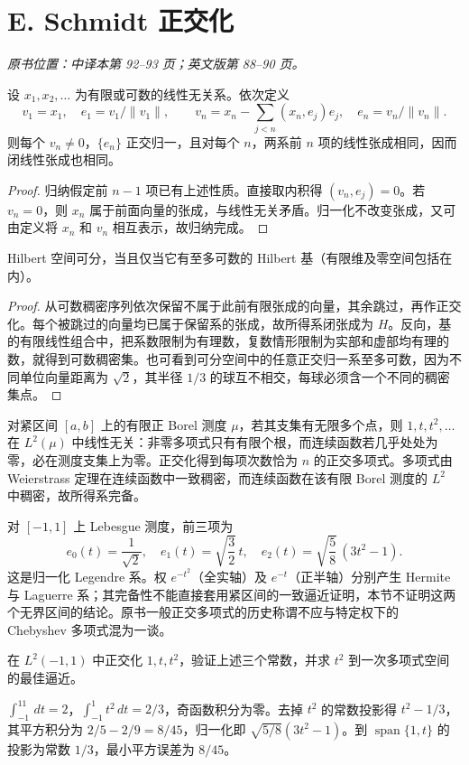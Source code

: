 \section{E. Schmidt 正交化}\label{sec:yosida-03-05}
\noindent\textit{原书位置：中译本第 92--93 页；英文版第 88--90 页。}

\begin{proposition}\label{prop:y3-schmidt}
设 $x_1,x_2,\ldots$ 为有限或可数的线性无关系。依次定义
\[
 v_1=x_1,\quad e_1=v_1/\|v_1\|,\qquad
 v_n=x_n-\sum_{j<n}(x_n,e_j)e_j,\quad e_n=v_n/\|v_n\|.
\]
则每个 $v_n\ne0$，$\{e_n\}$ 正交归一，且对每个 $n$，两系前 $n$ 项的线性张成相同，因而闭线性张成也相同。
\end{proposition}
\begin{proof}
归纳假定前 $n-1$ 项已有上述性质。直接取内积得 $(v_n,e_j)=0$。若 $v_n=0$，则 $x_n$ 属于前面向量的张成，与线性无关矛盾。归一化不改变张成，又可由定义将 $x_n$ 和 $v_n$ 相互表示，故归纳完成。
\end{proof}

\begin{corollary}[可分性]
Hilbert 空间可分，当且仅当它有至多可数的 Hilbert 基（有限维及零空间包括在内）。
\end{corollary}
\begin{proof}
从可数稠密序列依次保留不属于此前有限张成的向量，其余跳过，再作正交化。每个被跳过的向量均已属于保留系的张成，故所得系闭张成为 $H$。反向，基的有限线性组合中，把系数限制为有理数，复数情形限制为实部和虚部均有理的数，就得到可数稠密集。也可看到可分空间中的任意正交归一系至多可数，因为不同单位向量距离为 $\sqrt2$，其半径 $1/3$ 的球互不相交，每球必须含一个不同的稠密集点。
\end{proof}

\begin{example}[正交多项式]
对紧区间 $[a,b]$ 上的有限正 Borel 测度 $\mu$，若其支集有无限多个点，则 $1,t,t^2,\ldots$ 在 $L^2(\mu)$ 中线性无关：非零多项式只有有限个根，而连续函数若几乎处处为零，必在测度支集上为零。正交化得到每项次数恰为 $n$ 的正交多项式。多项式由 Weierstrass 定理在连续函数中一致稠密，而连续函数在该有限 Borel 测度的 $L^2$ 中稠密，故所得系完备。

对 $[-1,1]$ 上 Lebesgue 测度，前三项为
\[
 e_0(t)=\frac1{\sqrt2},\quad
 e_1(t)=\sqrt{\frac32}\,t,\quad
 e_2(t)=\sqrt{\frac58}\,(3t^2-1).
\]
这是归一化 Legendre 系。权 $e^{-t^2}$（全实轴）及 $e^{-t}$（正半轴）分别产生 Hermite 与 Laguerre 系；其完备性不能直接套用紧区间的一致逼近证明，本节不证明这两个无界区间的结论。原书一般正交多项式的历史称谓不应与特定权下的 Chebyshev 多项式混为一谈。
\end{example}

\begin{exercise}
在 $L^2(-1,1)$ 中正交化 $1,t,t^2$，验证上述三个常数，并求 $t^2$ 到一次多项式空间的最佳逼近。
\end{exercise}
\begin{solution}
$\int_{-1}^11\,dt=2$，$\int_{-1}^1t^2\,dt=2/3$，奇函数积分为零。去掉 $t^2$ 的常数投影得 $t^2-1/3$，其平方积分为 $2/5-2/9=8/45$，归一化即 $\sqrt{5/8}(3t^2-1)$。到 $\operatorname{span}\{1,t\}$ 的投影为常数 $1/3$，最小平方误差为 $8/45$。
\end{solution}
